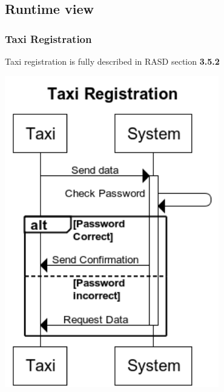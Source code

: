 \subsection{Runtime view}
	\subsubsection{Taxi Registration}
		Taxi registration is fully described in RASD section \textbf{3.5.2}
		\begin{center}
			\includegraphics[width=0.70\textwidth]{./images/Taxi_Registration.png}
		\end{center}
